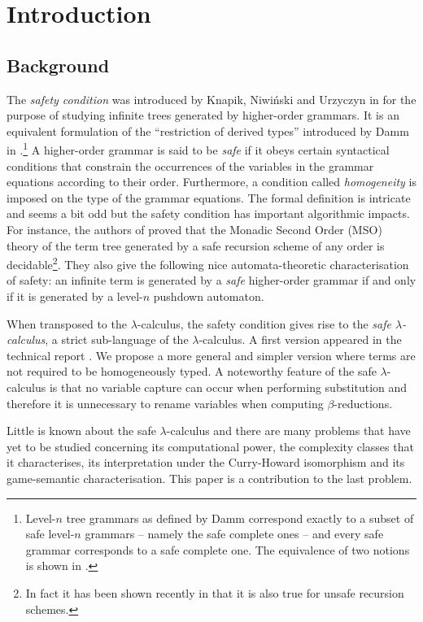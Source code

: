 \documentclass{llncs}
\begin{document}
\section{Introduction}

\subsection{Background}

The \emph{safety condition} was introduced by Knapik, Niwi{\'n}ski and Urzyczyn in \cite{KNU02} for the purpose of studying infinite trees generated by higher-order grammars.
It is an equivalent formulation of the ``restriction of derived types'' introduced by Damm in \cite{Dam82}.\footnote{Level-$n$ tree grammars as defined by Damm correspond exactly to a subset of safe level-$n$ grammars -- namely the safe complete ones -- and every safe grammar corresponds to a safe complete one. The equivalence of two notions is shown in \cite{demirandathesis}.}
A higher-order grammar is said to be \emph{safe} if it obeys certain syntactical conditions that constrain the occurrences of the variables in the grammar equations according to their order. Furthermore, a condition called \emph{homogeneity} is imposed on the type of the grammar equations.
The formal definition is intricate and seems a bit odd but the safety condition has important algorithmic impacts.
For instance, the authors of \cite{KNU02} proved that the Monadic Second Order (MSO) theory of the term tree generated by a safe recursion scheme of any order is decidable\footnote{In fact it has been shown recently in \cite{OngLics2006} that it is also true for unsafe recursion schemes.}. They also give the following nice automata-theoretic characterisation of safety:
an infinite term is generated by a \emph{safe} higher-order grammar if and only if it is generated by a level-$n$ pushdown automaton.


When transposed to the $\lambda$-calculus, the safety condition
gives rise to the \emph{safe $\lambda$-calculus}, a strict
sub-language of the $\lambda$-calculus. A first version appeared in the technical report \cite{safety-mirlong2004}. We propose a more general and simpler version where terms are not required to be homogeneously typed. A noteworthy feature of the safe $\lambda$-calculus is that no variable capture can occur when performing substitution and therefore it is unnecessary to rename variables when computing $\beta$-reductions.

Little is known about the safe $\lambda$-calculus and there are many problems that have yet to be studied concerning its computational power, the complexity classes that it characterises, its interpretation under the Curry-Howard isomorphism and its game-semantic characterisation. This paper is a contribution to the last problem.
\end{document}
